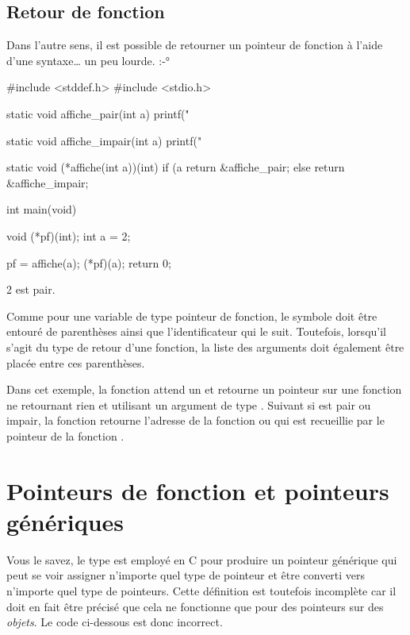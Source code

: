 \subsection{Retour de fonction}
\label{retour-de-fonction-3}

Dans l'autre sens, il est possible de retourner un pointeur de fonction
à l'aide d'une syntaxe\ldots{} un peu lourde. :-°

\begin{C}
#include <stddef.h>
#include <stdio.h>


static void affiche_pair(int a)
{
    printf("%
}


static void affiche_impair(int a)
{
    printf("%
}


static void (*affiche(int a))(int)
{
    if (a %
        return &affiche_pair;
    else
        return &affiche_impair;
}



int main(void)
{
    void (*pf)(int);
    int a = 2;

    pf = affiche(a);
    (*pf)(a);
    return 0;
}

\end{C}

\begin{C}
2 est pair.
\end{C}

Comme pour une variable de type pointeur de fonction, le symbole
\mybox{*} doit être entouré de parenthèses ainsi que l'identificateur
qui le suit. Toutefois, lorsqu'il s'agit du type de retour d'une
fonction, la liste des arguments doit également être placée entre ces
parenthèses.

Dans cet exemple, la fonction  attend un 
et retourne un pointeur sur une fonction ne retournant rien et utilisant
un argument de type . Suivant si  est pair ou
impair, la fonction  retourne l'adresse de la fonction
 ou  qui est
recueillie par le pointeur  de la fonction
.


\section{Pointeurs de fonction et pointeurs génériques}
\label{pointeurs-de-fonction-et-pointeurs-generiques}

Vous le savez, le type  est employé en C
pour produire un pointeur générique qui peut se voir assigner n'importe
quel type de pointeur et être converti vers n'importe quel type de
pointeurs. Cette définition est toutefois incomplète car il doit en fait
être précisé que cela ne fonctionne que pour des pointeurs sur des
\emph{objets}. Le code ci-dessous est donc incorrect.

